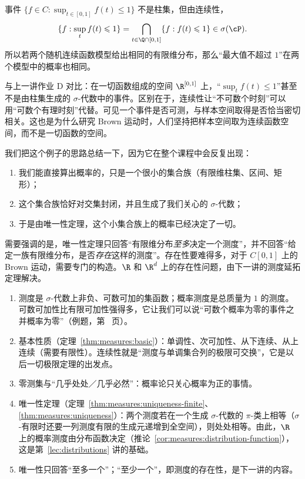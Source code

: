 \begin{example}
事件 $\{f\in C:\sup_{t\in[0,1]}f(t)\leqslant1\}$ 不是柱集，但由连续性，
\[
\{f:\sup_tf(t)\leqslant1\}=\bigcap_{t\in\Q\cap[0,1]}\{f:f(t)\leqslant1\}\in\sigma(\cP).
\]
所以若两个随机连续函数模型给出相同的有限维分布，那么“最大值不超过 $1$”在两个模型中的概率也相同。

与上一讲作业 D 对比：在一切函数组成的空间 $\R^{[0,1]}$ 上，“$\sup_tf(t)\leqslant1$”甚至不是由柱集生成的 $\sigma$-代数中的事件。区别在于，连续性让“不可数个时刻”可以用“可数个有理时刻”代替。可见一个事件是否可测，与样本空间取得是否恰当密切相关。这也是为什么研究 Brown 运动时，人们坚持把样本空间取为连续函数空间，而不是一切函数的空间。
\end{example}

\begin{remark}
我们把这个例子的思路总结一下，因为它在整个课程中会反复出现：
\begin{enumerate}
\item 我们能直接算出概率的，只是一个很小的集合族（有限维柱集、区间、矩形）；
\item 这个集合族恰好对交集封闭，并且生成了我们关心的 $\sigma$-代数；
\item 于是由唯一性定理，这个小集合族上的概率已经决定了一切。
\end{enumerate}
需要强调的是，唯一性定理只回答“有限维分布\emph{至多}决定一个测度”，并不回答“给定一族有限维分布，是否\emph{存在}这样的测度”。存在性要难得多，对于 $C[0,1]$ 上的 Brown 运动，需要专门的构造。$\R$ 和 $\R^d$ 上的存在性问题，由下一讲的测度延拓定理解决。
\end{remark}


\begin{enumerate}
\item 测度是 $\sigma$-代数上非负、可数可加的集函数；概率测度是总质量为 $1$ 的测度。可数可加性比有限可加性强得多，它让我们可以说“可数个概率为零的事件之并概率为零”（例题，第~\pageref{we:measures:rationals} 页）。
\item 基本性质（定理~\ref{thm:measures:basic}）：单调性、次可加性、从下连续、从上连续（需要有限性）。连续性就是“测度与单调集合列的极限可交换”，它是以后一切极限定理的出发点。
\item 零测集与“几乎处处／几乎必然”：概率论只关心概率为正的事情。
\item 唯一性定理（定理~\ref{thm:measures:uniqueness-finite}、\ref{thm:measures:uniqueness}）：两个测度若在一个生成 $\sigma$-代数的 $\pi$-类上相等（$\sigma$-有限时还要一列测度有限的生成元递增到全空间），则处处相等。由此，$\R$ 上的概率测度由分布函数决定（推论~\ref{cor:measures:distribution-function}），这是第~\ref{lec:distributions} 讲的基础。
\item 唯一性只回答“至多一个”；“至少一个”，即测度的存在性，是下一讲的内容。
\end{enumerate}

